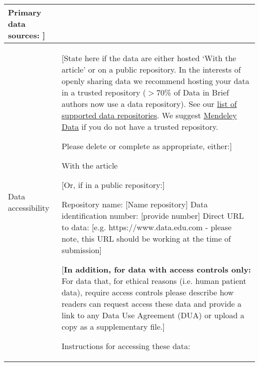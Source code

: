 \documentclass[times,final]{elsarticle.cls}
\begin{document}
{\begin{longtable}{|p{33mm}|p{94mm}|}
                         Primary data sources:  ]\\
\hline                         
\hypertarget{target1}
{Data accessibility}   & [State here if the data are either hosted `With the article' or on a public repository. 
                         In the interests of openly sharing data we recommend hosting your data in a 
                         trusted repository ($>$70\% of Data in Brief authors now use a data repository). 
                         See our \href{https://www.elsevier.com/authors/author-resources/research-data/data-base-linking#repositories}{list of supported data repositories}. 
                         We suggest \href{https://data.mendeley.com/}{Mendeley Data} if you do not have a trusted repository.\newline

                         Please delete or complete as appropriate, either:]\newline

                         With the article\newline

                         [Or, if in a public repository:]\newline

                         Repository name: [Name repository]\newline
                         Data identification number: [provide number]\newline
                         Direct URL to data: [e.g. https://www.data.edu.com - please note,\newline 
                         this URL should be working at the time of submission]\newline

                         [\textbf{In addition, for data with access controls only:} For data that, 
                         for ethical reasons (i.e. human patient data), 
                         require access controls please describe
                         how readers can request access these data and provide a link to any 
                         Data Use Agreement (DUA) or upload a copy as a supplementary file.]\newline

                         Instructions for accessing these data:\newline


\end{longtable}}
\end{document}
